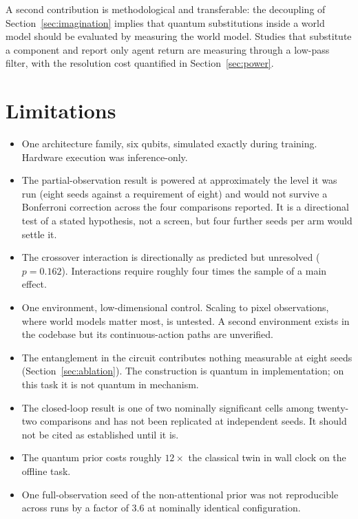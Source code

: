 \documentclass[11pt,onecolumn]{article}
\newif\ifdraft
\newcommand{\pend}[1]{%
  \ifdraft\textcolor{PendFG}{\textbf{[}\textit{#1}\textbf{]}}\fi}
\begin{document}
A second contribution is methodological and transferable: the
decoupling of Section~\ref{sec:imagination} implies that quantum
substitutions inside a world model should be evaluated by measuring the
world model. Studies that substitute a component and report only agent
return are measuring through a low-pass filter, with the resolution cost
quantified in Section~\ref{sec:power}.

\section{Limitations}
\begin{itemize}\itemsep3pt
\item One architecture family, six qubits, simulated exactly during
      training. Hardware execution was inference-only.
\item The partial-observation result is powered at approximately the
      level it was run (eight seeds against a requirement of eight) and
      would not survive a Bonferroni correction across the four
      comparisons reported. It is a directional test of a stated
      hypothesis, not a screen, but four further seeds per arm would
      settle it.
\item The crossover interaction is directionally as predicted but
      unresolved ($p = 0.162$). Interactions require roughly four times
      the sample of a main effect.
\item One environment, low-dimensional control. Scaling to pixel
      observations, where world models matter most, is untested. A
      second environment exists in the codebase but its
      continuous-action paths are unverified.
\item The entanglement in the circuit contributes nothing measurable at
      eight seeds (Section~\ref{sec:ablation}). The construction is
      quantum in implementation; on this task it is not quantum in
      mechanism.
\item The closed-loop result is one of two nominally significant cells
      among twenty-two comparisons and has not been replicated at
      independent seeds. It should not be cited as established until it
      is.
\item The quantum prior costs roughly $12\times$ the classical twin in
      wall clock on the offline task. \pend{closed-loop ratio from
      uninterrupted runs}
\item One full-observation seed of the non-attentional prior was not
      reproducible across runs by a factor of $3.6$ at nominally
      identical configuration. \pend{resolve: the leading hypothesis is
      CPU thread count altering floating-point reduction order}
\end{itemize}
\end{document}
